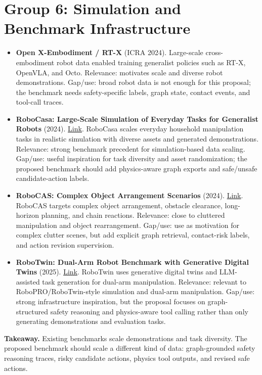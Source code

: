 \section*{Group 6: Simulation and Benchmark Infrastructure}

\begin{itemize}
\item \textbf{Open X-Embodiment / RT-X} (ICRA 2024). Large-scale cross-embodiment robot data enabled training generalist policies such as RT-X, OpenVLA, and Octo. Relevance: motivates scale and diverse robot demonstrations. Gap/use: broad robot data is not enough for this proposal; the benchmark needs safety-specific labels, graph state, contact events, and tool-call traces.

\item \textbf{RoboCasa: Large-Scale Simulation of Everyday Tasks for Generalist Robots} (2024). \href{https://arxiv.org/abs/2406.02523}{Link}. RoboCasa scales everyday household manipulation tasks in realistic simulation with diverse assets and generated demonstrations. Relevance: strong benchmark precedent for simulation-based data scaling. Gap/use: useful inspiration for task diversity and asset randomization; the proposed benchmark should add physics-aware graph exports and safe/unsafe candidate-action labels.

\item \textbf{RoboCAS: Complex Object Arrangement Scenarios} (2024). \href{https://arxiv.org/abs/2407.06951}{Link}. RoboCAS targets complex object arrangement, obstacle clearance, long-horizon planning, and chain reactions. Relevance: close to cluttered manipulation and object rearrangement. Gap/use: use as motivation for complex clutter scenes, but add explicit graph retrieval, contact-risk labels, and action revision supervision.

\item \textbf{RoboTwin: Dual-Arm Robot Benchmark with Generative Digital Twins} (2025). \href{https://arxiv.org/abs/2504.13059}{Link}. RoboTwin uses generative digital twins and LLM-assisted task generation for dual-arm manipulation. Relevance: relevant to RoboPRO/RoboTwin-style simulation and dual-arm manipulation. Gap/use: strong infrastructure inspiration, but the proposal focuses on graph-structured safety reasoning and physics-aware tool calling rather than only generating demonstrations and evaluation tasks.
\end{itemize}

\textbf{Takeaway.} Existing benchmarks scale demonstrations and task diversity. The proposed benchmark should scale a different kind of data: graph-grounded safety reasoning traces, risky candidate actions, physics tool outputs, and revised safe actions.

